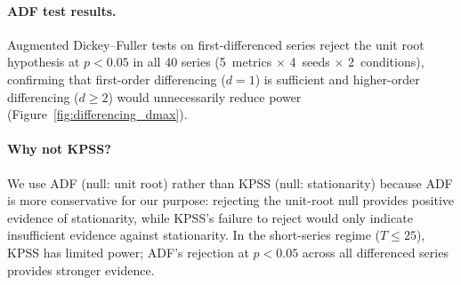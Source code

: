 \begin{table}[H]
\centering
\small
\caption{Empirical AR(1) coefficients (Pythia-410M, 4~seeds). ``Raw'' = levels; ``Diff'' = first-differenced.}
\label{tab:empirical_ar1}
\end{table}

\paragraph{ADF test results.}
Augmented Dickey--Fuller tests on first-differenced series reject the unit root hypothesis at $p{<}0.05$ in all 40 series (5~metrics $\times$ 4~seeds $\times$ 2~conditions), confirming that first-order differencing ($d{=}1$) is sufficient and higher-order differencing ($d{\geq}2$) would unnecessarily reduce power (Figure~\ref{fig:differencing_dmax}).

\paragraph{Why not KPSS?}
We use ADF (null: unit root) rather than KPSS (null: stationarity) because ADF is more conservative for our purpose: rejecting the unit-root null provides positive evidence of stationarity, while KPSS's failure to reject would only indicate insufficient evidence against stationarity.
In the short-series regime ($T{\leq}25$), KPSS has limited power; ADF's rejection at $p{<}0.05$ across all differenced series provides stronger evidence.

